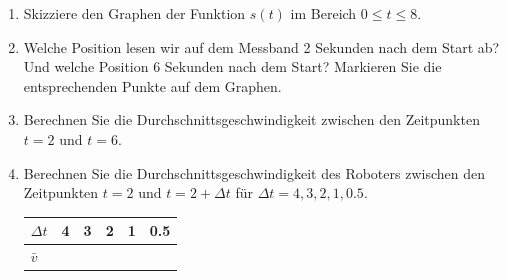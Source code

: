 \begin{enumerate}
    \item Skizziere den Graphen der Funktion $s(t)$ im Bereich $0 \leq t \leq 8$.
          \begin{center}
          \end{center}


    \item Welche Position lesen wir auf dem Messband 2 Sekunden nach dem Start ab? Und welche Position 6 Sekunden nach dem Start? Markieren Sie die entsprechenden Punkte auf dem Graphen.
    \item Berechnen Sie die Durchschnittsgeschwindigkeit zwischen den Zeitpunkten $t=2$ und $t=6$.
    \item Berechnen Sie die Durchschnittsgeschwindigkeit des Roboters zwischen den Zeitpunkten $t=2$ und $t=2+\Delta t$ für $\Delta t=4,3,2,1,0.5$.
          \begin{center}
              \begin{tabular}{p{1.5cm} p{1.5cm} p{1.5cm} p{1.5cm} p{1.5cm} p{1.5cm}}
                  \hline
                  $\Delta t$ & 4 & 3 & 2 & 1 & 0.5 \\
                  \hline
                  $\bar{v}$  &   &   &   &   &     \\
                  \hline
              \end{tabular}
          \end{center}



\end{enumerate}
